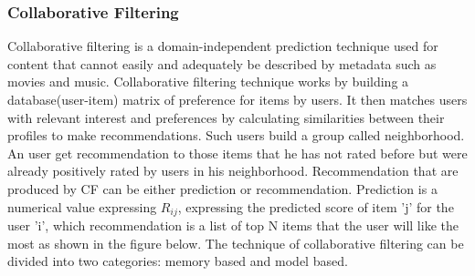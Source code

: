 \subsubsection{Collaborative Filtering}
Collaborative filtering \cite{rmain}is a domain-independent prediction technique used for content that cannot easily and adequately be described by metadata such as movies and music. Collaborative filtering technique works by building a database(user-item) matrix of preference for items by users. It then matches users with relevant interest and preferences by calculating similarities between their profiles to make recommendations. Such users build a group called neighborhood. An user get recommendation to those items that he has not rated before but were already positively rated by users in his neighborhood. Recommendation that are produced by CF can be either prediction or recommendation. Prediction is a numerical value expressing $R_{ij}$, expressing the predicted score of item 'j' for the user 'i', which recommendation is a list of top N items that the user will like the most as shown in the figure below. The technique of collaborative filtering can be divided into two categories: memory based and model based. 

